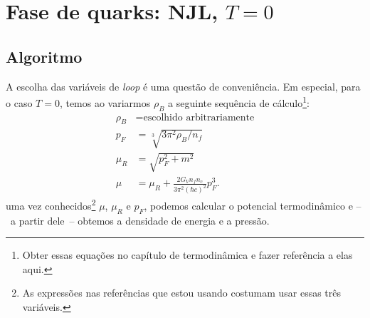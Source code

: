 \section{Fase de quarks: NJL, $T = 0$}

\subsection{Algoritmo}

A escolha das variáveis de \emph{loop} é uma questão de conveniência. Em especial, para o caso $T = 0$, temos ao variarmos $\rho_B$ a seguinte sequência de cálculo\footnote{Obter essas equações no capítulo de termodinâmica e fazer referência a elas aqui.}:
\begin{align}
	\rho_B &= \textrm{escolhido arbitrariamente} \\
	p_F &= \sqrt[3]{3 \pi^2 \rho_B / n_f} \label{Eq:mom_fermi_rho_bar}\\
	\mu_R &= \sqrt{p_F^2 + m^2} \label{Eq:pot_quim_renorm_loop_dens_bar}\\
	\mu &= \mu_R + \frac{2 G_V n_f n_c}{3\pi^2(\hbar c)^2} p_F^3.
\end{align}
%
uma vez conhecidos\footnote{As expressões nas referências que estou usando costumam usar essas três variáveis.} $\mu$, $\mu_R$ e $p_F$, podemos calcular o potencial termodinâmico e --~a partir dele~-- obtemos a densidade de energia e a pressão.

